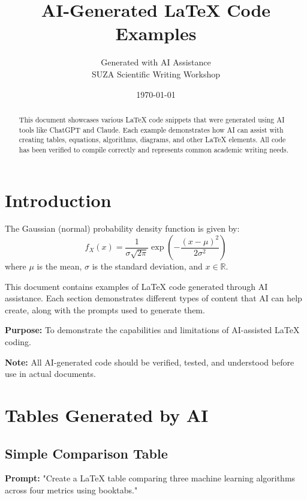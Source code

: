 \documentclass[12pt, a4paper]{article}
\title{AI-Generated LaTeX Code Examples}
\author{Generated with AI Assistance\\
        SUZA Scientific Writing Workshop}
\date{\today}
\begin{document}
\maketitle

\begin{abstract}
This document showcases various LaTeX code snippets that were generated using AI tools like ChatGPT and Claude. Each example demonstrates how AI can assist with creating tables, equations, algorithms, diagrams, and other LaTeX elements. All code has been verified to compile correctly and represents common academic writing needs.
\end{abstract}

\tableofcontents
\newpage

\section{Introduction}

The Gaussian (normal) probability density function is given by:
\begin{equation}
f_X(x) = \frac{1}{\sigma \sqrt{2\pi}} \exp\left(-\frac{(x - \mu)^2}{2\sigma^2}\right)
\label{eq:gaussian_pdf_std}
\end{equation}
where $\mu$ is the mean, $\sigma$ is the standard deviation, and $x \in \mathbb{R}$.

This document contains examples of LaTeX code generated through AI assistance. Each section demonstrates different types of content that AI can help create, along with the prompts used to generate them.

\textbf{Purpose:} To demonstrate the capabilities and limitations of AI-assisted LaTeX coding.

\textbf{Note:} All AI-generated code should be verified, tested, and understood before use in actual documents.

\section{Tables Generated by AI}

\subsection{Simple Comparison Table}

\textbf{Prompt:} "Create a LaTeX table comparing three machine learning algorithms across four metrics using booktabs."
\end{document}

